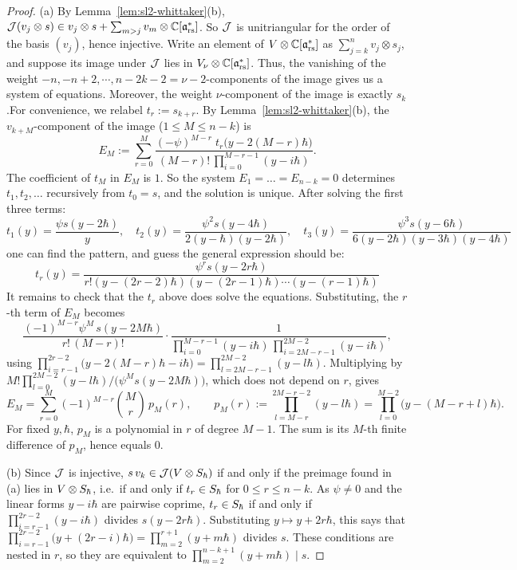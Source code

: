 \documentclass{article}
\theoremstyle{plain}
\theoremstyle{definition}
\theoremstyle{remark}
\numberwithin{equation}{section}
\begin{document}
\begin{proof}
(a) By Lemma~\ref{lem:sl2-whittaker}(b), $\mathcal J(v_j\otimes s)\in v_j\otimes s+\sum_{m>j}v_m\otimes\mathbb{C}[\mathfrak{a}^*_{\mathrm{rs}}]$. So $\mathcal J$ is unitriangular for the order of the basis $(v_j)$, hence injective. Write an element of $V\otimes\mathbb{C}[\mathfrak{a}^*_{\mathrm{rs}}]$ as $\sum_{j=k}^{n}v_j\otimes s_j$, and suppose its image under $\mathcal J$ lies in $V_\nu\otimes\mathbb{C}[\mathfrak{a}^*_{\mathrm{rs}}]$. Thus, the vanishing of the weight $-n,-n+2, \cdots, n-2k-2 = \nu -2$-components of the image gives us a system of equations. Moreover, the weight $\nu$-component of the image is exactly $s_k$.For convenience, we relabel $t_r:=s_{k+r}$. By Lemma~\ref{lem:sl2-whittaker}(b), the $v_{k+M}$-component of the image ($1\le M\le n-k$) is
\begin{equation}\label{eq:sl2-EM}
E_M:=\sum_{r=0}^{M}\frac{(-\psi)^{M-r}\;t_r\bigl(y-2(M-r)\hbar\bigr)}{(M-r)!\,\prod_{i=0}^{M-r-1}(y-i\hbar)} .
\end{equation}
The coefficient of $t_M$ in $E_M$ is $1$. So the system $E_1=\dots=E_{n-k}=0$ determines $t_1,t_2,\dots$ recursively from $t_0=s$, and the solution is unique. After solving the first three terms:
\begin{equation*}
    t_1(y) = \frac{\psi s(y-2\hbar)}{y},\quad t_2(y)=\frac{\psi^2 s(y-4\hbar)}{2(y-\hbar)(y-2\hbar)}, \quad t_3(y) = \frac{\psi^3 s(y-6\hbar)}{6(y-2\hbar)(y-3\hbar)(y-4\hbar)}
\end{equation*}
one can find the pattern, and guess the general expression should be:
\begin{equation*}
    t_r(y) = \frac{\psi^r s(y-2r\hbar)}{r! (y-(2r-2)\hbar)(y-(2r-1)\hbar)\cdots (y-(r-1)\hbar)}
\end{equation*}
It remains to check that the $t_r$ above does solve the equations. Substituting, the $r$-th term of $E_M$ becomes
\[
\frac{(-1)^{M-r}\psi^M\,s(y-2M\hbar)}{r!\,(M-r)!}\cdot\frac{1}{\prod_{i=0}^{M-r-1}(y-i\hbar)\,\prod_{i=2M-r-1}^{2M-2}(y-i\hbar)},
\]
using $\prod_{i=r-1}^{2r-2}\bigl(y-2(M-r)\hbar-i\hbar\bigr)=\prod_{l=2M-r-1}^{2M-2}(y-l\hbar)$. Multiplying by $M!\prod_{l=0}^{2M-2}(y-l\hbar)\big/\bigl(\psi^Ms(y-2M\hbar)\bigr)$, which does not depend on $r$, gives
\[
E_M=\sum_{r=0}^M(-1)^{M-r}\binom Mr\,p_M(r),\qquad p_M(r):=\prod_{l=M-r}^{2M-r-2}(y-l\hbar)=\prod_{l=0}^{M-2}\bigl(y-(M-r+l)\hbar\bigr).
\]
For fixed $y,\hbar$, $p_M$ is a polynomial in $r$ of degree $M-1$. The sum is its $M$-th finite difference of $p_M$, hence equals $0$.

(b) Since $\mathcal J$ is injective, $s\,v_k\in\mathcal J(V\otimes S_\hbar)$ if and only if the preimage found in (a) lies in $V\otimes S_\hbar$, i.e.\ if and only if $t_r\in S_\hbar$ for $0\le r\le n-k$. As $\psi\neq0$ and the linear forms $y-i\hbar$ are pairwise coprime, $t_r\in S_\hbar$ if and only if $\prod_{i=r-1}^{2r-2}(y-i\hbar)$ divides $s(y-2r\hbar)$. Substituting $y\mapsto y+2r\hbar$, this says that $\prod_{i=r-1}^{2r-2}\bigl(y+(2r-i)\hbar\bigr)=\prod_{m=2}^{r+1}(y+m\hbar)$ divides $s$. These conditions are nested in $r$, so they are equivalent to $\prod_{m=2}^{n-k+1}(y+m\hbar)\mid s$.
\end{proof}
\end{document}
